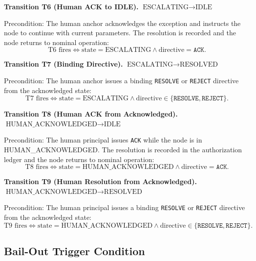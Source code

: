 \bigskip
\noindent\textbf{Transition T6 (Human ACK to IDLE).} $\text{ESCALATING} \rightarrow \text{IDLE}$

Precondition: The human anchor acknowledges the exception and instructs the node to continue with current parameters. The resolution is recorded and the node returns to nominal operation:
\begin{equation}
\text{T6 fires} \iff \text{state} = \text{ESCALATING} \land \text{directive} = \texttt{ACK}. \tag{T6}
\end{equation}

\bigskip
\noindent\textbf{Transition T7 (Binding Directive).} $\text{ESCALATING} \rightarrow \text{RESOLVED}$

Precondition: The human anchor issues a binding \texttt{RESOLVE} or \texttt{REJECT} directive from the acknowledged state:
\begin{equation}
\text{T7 fires} \iff \text{state} = \text{ESCALATING} \land \text{directive} \in \{\texttt{RESOLVE}, \texttt{REJECT}\}. \tag{T7}
\end{equation}

\bigskip
\noindent\textbf{Transition T8 (Human ACK from Acknowledged).} $\text{HUMAN\_ACKNOWLEDGED} \rightarrow \text{IDLE}$

Precondition: The human principal issues \texttt{ACK} while the node is in HUMAN\_ACKNOWLEDGED. The resolution is recorded in the authorization ledger and the node returns to nominal operation:
\begin{equation}
\text{T8 fires} \iff \text{state} = \text{HUMAN\_ACKNOWLEDGED} \land \text{directive} = \texttt{ACK}. \tag{T8}
\end{equation}

\bigskip
\noindent\textbf{Transition T9 (Human Resolution from Acknowledged).} $\text{HUMAN\_ACKNOWLEDGED} \rightarrow \text{RESOLVED}$

Precondition: The human principal issues a binding \texttt{RESOLVE} or \texttt{REJECT} directive from the acknowledged state:
\begin{equation}
\text{T9 fires} \iff \text{state} = \text{HUMAN\_ACKNOWLEDGED} \land \text{directive} \in \{\texttt{RESOLVE}, \texttt{REJECT}\}. \tag{T9}
\end{equation}

\subsection{Bail-Out Trigger Condition}\label{sec:bailout-trigger}

